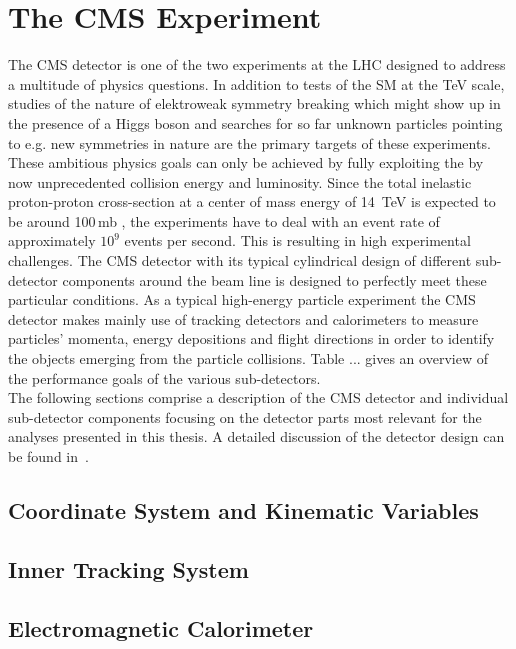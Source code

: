 \section{The CMS Experiment}
\label{sec:cms}
The CMS detector is one of the two experiments at the LHC designed to address a multitude of physics questions. In addition to tests of the SM at the TeV scale, studies of the nature of elektroweak symmetry breaking which might show up in the presence of a Higgs boson and searches for so far unknown particles pointing to e.g. new symmetries in nature are the primary targets of these experiments. These ambitious physics goals can only be achieved by fully exploiting the by now unprecedented collision energy and luminosity. Since the total inelastic proton-proton cross-section at a center of mass energy of 14~TeV is expected to be around 100\,mb , the experiments have to deal with an event rate of approximately $10^9$ events per second. This is resulting in high experimental challenges. The CMS detector with its typical cylindrical design of different sub-detector components around the beam line is designed to perfectly meet these particular conditions. As a typical high-energy particle experiment the CMS detector makes mainly use of tracking detectors and calorimeters to measure particles' momenta, energy depositions and flight directions in order to identify the objects emerging from the particle collisions. Table ...  gives an overview of the performance goals of the various sub-detectors. \\  
The following sections comprise a description of the CMS detector and individual sub-detector components focusing on the detector parts most relevant for the analyses presented in this thesis. A detailed discussion of the detector design can be found in~\cite{Chatrchyan:2008zzk, bib:cmsptdr1}.

\subsection{Coordinate System and Kinematic Variables}
\label{subsec:cms_coordinates}

\subsection{Inner Tracking System}
\label{subsec:cms_tracker}

\subsection{Electromagnetic Calorimeter}
\label{subsec:cms_ecal}

